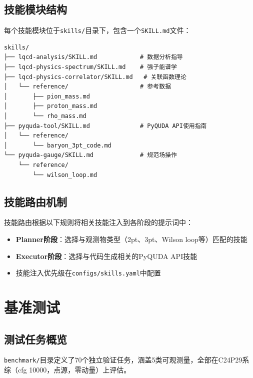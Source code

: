 \documentclass[12pt,a4paper]{ctexart}
\begin{document}
\subsection{技能模块结构}

每个技能模块位于\texttt{skills/}目录下，包含一个\texttt{SKILL.md}文件：

\begin{lstlisting}[caption={技能模块目录结构}]
skills/
├── lqcd-analysis/SKILL.md            # 数据分析指导
├── lqcd-physics-spectrum/SKILL.md    # 强子能谱学
├── lqcd-physics-correlator/SKILL.md   # 关联函数理论
│   └── reference/                    # 参考数据
│       ├── pion_mass.md
│       ├── proton_mass.md
│       └── rho_mass.md
├── pyquda-tool/SKILL.md              # PyQUDA API使用指南
│   └── reference/
│       └── baryon_3pt_code.md
└── pyquda-gauge/SKILL.md             # 规范场操作
    └── reference/
        └── wilson_loop.md
\end{lstlisting}

\subsection{技能路由机制}

技能路由根据以下规则将相关技能注入到各阶段的提示词中：
\begin{itemize}[leftmargin=*]
    \item \textbf{Planner阶段}：选择与观测物类型（2pt、3pt、Wilson loop等）匹配的技能
    \item \textbf{Executor阶段}：选择与代码生成相关的PyQUDA API技能
    \item 技能注入优先级在\texttt{configs/skills.yaml}中配置
\end{itemize}

\section{基准测试}

\subsection{测试任务概览}

\texttt{benchmark/}目录定义了70个独立验证任务，涵盖5类可观测量，全部在C24P29系综（cfg 10000，点源，零动量）上评估。
\end{document}
